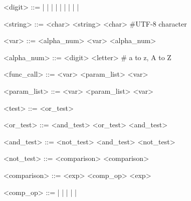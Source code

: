 \documentclass[fleqn,a4paper,11pt]{jsarticle}
\begin{document}
\begin{grammar}
<digit> ::=  |  |  |  |  |  |  |  |  | 

<string> ::= <char> <string>
\alt <char> \#UTF-8 character

<var> ::= <alpha_num> <var>
\alt <alpha_num>

<alpha_num> ::= <digit>
\alt <letter> \# a to z, A to Z
\alt \lit{_}

<func_call> ::= <var> \lit{(} <param_list> \lit{)}
\alt <var> \lit{()}

<param_list> ::= <var>\lit{,} <param_list> 
\alt <var>

<test> ::= <or_test>

<or_test> ::= <and_test> \lit{\textbar\textbar} <or_test>
\alt <and_test>

<and_test> ::= <not_test> \lit{\&\&} <and_test>
\alt <not_test>

<not_test> ::= \lit{!} <comparison>
\alt <comparison>

<comparison> ::= <exp> <comp_op> <exp> 

<comp_op> ::= \lit{==} | \lit{!=} | \lit{\textgreater} | \lit{\textless} | \lit{\textgreater =} | \lit{\textless =}
\end{grammar}
\end{document}
